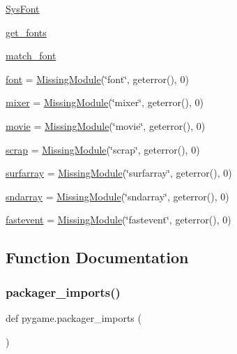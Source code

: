 \begin{DoxyCompactItemize}
\hyperlink{namespacepygame_aa625a5d1e79bdc9c429ff8b6949f239a}{Sys\+Font}
\item 
\hyperlink{namespacepygame_a81c3c76aaedffb4ca4f45d133b3c8a75}{get\+\_\+fonts}
\item 
\hyperlink{namespacepygame_a67d83ff8ac3e17b3ee0ed85f1afd844a}{match\+\_\+font}
\item 
\hyperlink{namespacepygame_abb19afafd341333a96759d8d39829f0e}{font} = \hyperlink{classpygame_1_1_missing_module}{Missing\+Module}(\char`\"{}font\char`\"{}, geterror(), 0)
\item 
\hyperlink{namespacepygame_ab7515b51eb7665f5f7cc835e3f3525c1}{mixer} = \hyperlink{classpygame_1_1_missing_module}{Missing\+Module}(\char`\"{}mixer\char`\"{}, geterror(), 0)
\item 
\hyperlink{namespacepygame_a5792f2ba5de6e56021afff5a88231ae4}{movie} = \hyperlink{classpygame_1_1_missing_module}{Missing\+Module}(\char`\"{}movie\char`\"{}, geterror(), 0)
\item 
\hyperlink{namespacepygame_a4dfa0f8fc31eed42ae0e323eedbc9610}{scrap} = \hyperlink{classpygame_1_1_missing_module}{Missing\+Module}(\char`\"{}scrap\char`\"{}, geterror(), 0)
\item 
\hyperlink{namespacepygame_aee8717e80ca1983db610b2c66b177f1e}{surfarray} = \hyperlink{classpygame_1_1_missing_module}{Missing\+Module}(\char`\"{}surfarray\char`\"{}, geterror(), 0)
\item 
\hyperlink{namespacepygame_a2549bee6a43c4895ebfb6bbdc4139f29}{sndarray} = \hyperlink{classpygame_1_1_missing_module}{Missing\+Module}(\char`\"{}sndarray\char`\"{}, geterror(), 0)
\item 
\hyperlink{namespacepygame_ae47d8cf1ce2ded3ecad9fd088168290e}{fastevent} = \hyperlink{classpygame_1_1_missing_module}{Missing\+Module}(\char`\"{}fastevent\char`\"{}, geterror(), 0)
\end{DoxyCompactItemize}


\subsection{Function Documentation}
\mbox{\label{namespacepygame_a28ba3de162ca0d56169f21417e17a9cb}} 
\subsubsection{\texorpdfstring{packager\+\_\+imports()}{packager\_imports()}}
{\footnotesize\ttfamily def pygame.\+packager\+\_\+imports (\begin{DoxyParamCaption}{ }\end{DoxyParamCaption})}

